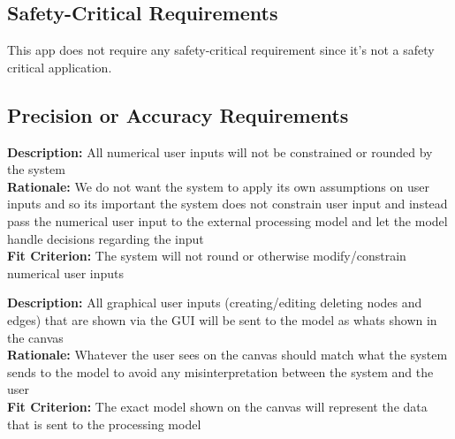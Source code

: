 \documentclass[12pt]{article}
\begin{document}
\subsection{Safety-Critical Requirements}
This app does not require any safety-critical requirement since it's not a safety critical application. 
\subsection{Precision or Accuracy Requirements}
\begin{tcolorbox}[title=PPA1]
  \textbf{Description:} All numerical user inputs will not be constrained or rounded by the system \\
  \textbf{Rationale:} We do not want the system to apply its own assumptions on user inputs and so its important the system does not constrain user input and instead pass the numerical user input to the external processing model and let the model handle decisions regarding the input \\
  \textbf{Fit Criterion:} The system will not round or otherwise modify/constrain numerical user inputs 
\end{tcolorbox}
\begin{tcolorbox}[title=PPA2]
  \textbf{Description:} All graphical user inputs (creating/editing deleting nodes and edges) that are shown via the GUI will be sent to the model as whats shown in the canvas \\
  \textbf{Rationale:} Whatever the user sees on the canvas should match what the system sends to the model to avoid any misinterpretation between the system and the user \\
  \textbf{Fit Criterion:} The exact model shown on the canvas will represent the data that is sent to the processing model 
\end{tcolorbox}
\end{document}

